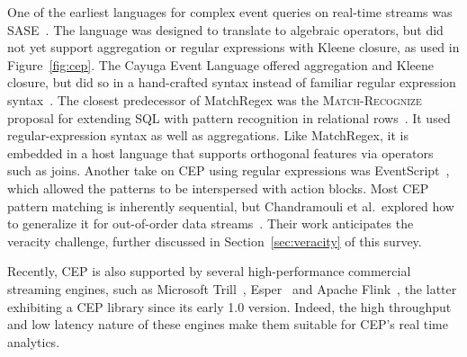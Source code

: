 One of the earliest languages for complex event queries on real-time
streams was \textsf{SASE}~\cite{WuDR06}. The language was designed to translate
to algebraic operators, but did not yet support aggregation or regular
expressions with Kleene closure, as used in Figure~\ref{fig:cep}.
The Cayuga Event Language offered aggregation and Kleene closure, but
did so in a hand-crafted syntax instead of familiar regular expression
syntax~\cite{demers_et_al_2007}.
The closest predecessor of MatchRegex was the \textsc{Match-Recognize}
proposal for extending SQL with pattern recognition in relational
rows~\cite{zemke_et_al_2007}. It used regular-expression syntax as
well as aggregations. Like MatchRegex, it is embedded in a host
language that supports orthogonal features via operators such as
joins.
Another take on CEP using regular expressions was
\textsf{EventScript}~\cite{cohen_kalleberg_2008}, which allowed the patterns to
be interspersed with action blocks.
Most CEP pattern matching is inherently sequential, but Chandramouli et
al.\ explored how to generalize it for out-of-order data
streams~\cite{chandramouli_goldstein_maier_2010}. Their work
anticipates the veracity challenge, further discussed in
Section~\ref{sec:veracity} of this survey.


Recently, CEP is also supported by several
high-performance commercial streaming engines, such as Microsoft
Trill~\cite{chandramouli_et_al_2014}, Esper~\cite{Esper18} and Apache
Flink~\cite{carbone_et_al_2015}, the latter
exhibiting a CEP library since its early 1.0 version. 
Indeed, the high throughput
and low latency nature of these engines make them suitable for CEP's real
time analytics. 
